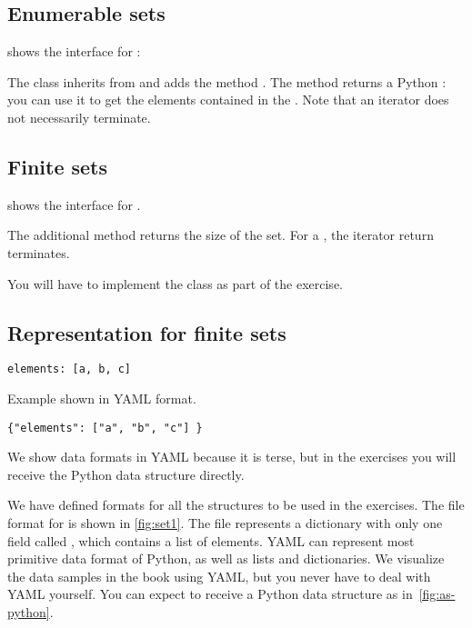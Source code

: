 \subsection*{Enumerable sets}

 shows the interface for \EnumerableSet:


The class inherits from \Setoid and adds the method .
The method returns a Python \Iterator: you can use it to get the elements contained in the \EnumerableSet.
Note that an iterator does not necessarily terminate.

\subsection*{Finite sets}

 shows the interface for \FiniteSet.


The additional method  returns the size of the set.
For a \FiniteSet, the iterator return  terminates.

You will have to implement the \FiniteSet class as part of the exercise.

\subsection*{Representation for finite sets }

\begin{marginfigure}
    \begin{verbatim}
elements: [a, b, c]
    \end{verbatim}
    \caption{Example shown in YAML format.}
    \label{fig:set1}
\end{marginfigure}

\begin{marginfigure}
    \begin{verbatim}
{"elements": ["a", "b", "c"] }
    \end{verbatim}
    \caption{We show data formats in YAML because it is terse, but in the exercises you will receive the Python data structure directly.}
    \label{fig:as-python}
\end{marginfigure}

We have defined formats for all the structures to be used in the exercises.
The file format for \FiniteSet is shown in \cref{fig:set1}.
The file represents a dictionary with only one field called , which contains a list of elements.
YAML can represent most primitive data format of Python, as well as lists and dictionaries.
We visualize the data samples in the book using YAML, but you never have to deal with YAML yourself.
You can expect to receive a Python data structure as in~\cref{fig:as-python}.

